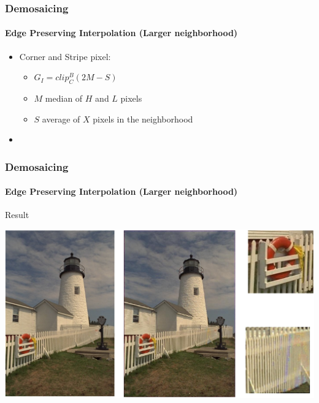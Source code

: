 \documentclass{beamer}
\begin{document}
\begin{frame}
\frametitle{Demosaicing}
\framesubtitle{Edge Preserving Interpolation \small{(Larger neighborhood)}}
\begin{itemize}
\item Corner and Stripe pixel:
\begin{itemize}
\item $G_{I} = clip^{B}_{C}(2M -S)$
\item $M$ median of $H$ and $L$ pixels 
\item $S$ average of $X$ pixels in the neighborhood
\end{itemize}
\item[]
\end{itemize}
\end{frame}

\begin{frame}
\frametitle{Demosaicing}
\framesubtitle{Edge Preserving Interpolation \small{(Larger neighborhood)}}
\begin{block}{Result}
\begin{center}
\includegraphics[scale=0.33]{images/L7_res_PRI.png}
\end{center}

\end{block}
\end{frame}
\end{document}
